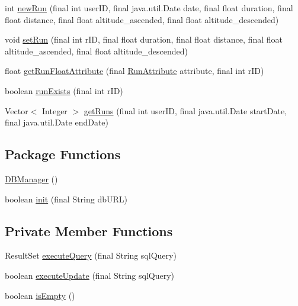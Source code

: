\begin{DoxyCompactItemize}
\item 
int \mbox{\hyperlink{classcom_1_1activitytracker_1_1_d_b_manager_a25beffc49198126ce078e5ebb473b695}{new\+Run}} (final int user\+ID, final java.\+util.\+Date date, final float duration, final float distance, final float altitude\+\_\+ascended, final float altitude\+\_\+descended)
\item 
void \mbox{\hyperlink{classcom_1_1activitytracker_1_1_d_b_manager_a72282377a552ce4ce371abff02e312f2}{set\+Run}} (final int r\+ID, final float duration, final float distance, final float altitude\+\_\+ascended, final float altitude\+\_\+descended)
\item 
float \mbox{\hyperlink{classcom_1_1activitytracker_1_1_d_b_manager_a666452f1e5862f90c06b0beb9a9fcfdd}{get\+Run\+Float\+Attribute}} (final \mbox{\hyperlink{enumcom_1_1activitytracker_1_1_run_attribute}{Run\+Attribute}} attribute, final int r\+ID)
\item 
boolean \mbox{\hyperlink{classcom_1_1activitytracker_1_1_d_b_manager_a723ac1c573bacdd0b62894357bd65a9b}{run\+Exists}} (final int r\+ID)
\item 
Vector$<$ Integer $>$ \mbox{\hyperlink{classcom_1_1activitytracker_1_1_d_b_manager_a48d9e51c1b73064b8f773cdde5113928}{get\+Runs}} (final int user\+ID, final java.\+util.\+Date start\+Date, final java.\+util.\+Date end\+Date)
\end{DoxyCompactItemize}
\subsection*{Package Functions}
\begin{DoxyCompactItemize}
\item 
\mbox{\hyperlink{classcom_1_1activitytracker_1_1_d_b_manager_ac1f558ef56fe02d74fe103a473a15bb5}{D\+B\+Manager}} ()
\item 
boolean \mbox{\hyperlink{classcom_1_1activitytracker_1_1_d_b_manager_a41df4600bb5901a26a4ea6a7108a70b9}{init}} (final String db\+U\+RL)
\end{DoxyCompactItemize}
\subsection*{Private Member Functions}
\begin{DoxyCompactItemize}
\item 
Result\+Set \mbox{\hyperlink{classcom_1_1activitytracker_1_1_d_b_manager_adef71a18dc05536d80e83311841e1953}{execute\+Query}} (final String sql\+Query)
\item 
boolean \mbox{\hyperlink{classcom_1_1activitytracker_1_1_d_b_manager_a382397e2bdf309901d1c80ff66be69b7}{execute\+Update}} (final String sql\+Query)
\item 
boolean \mbox{\hyperlink{classcom_1_1activitytracker_1_1_d_b_manager_af9ab112f840e3c803b6b28a2f1a15215}{is\+Empty}} ()
\end{DoxyCompactItemize}
